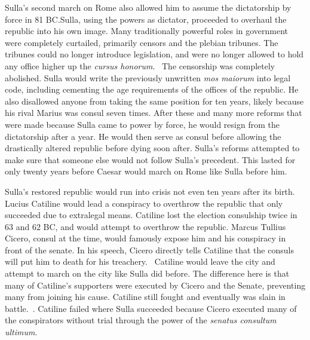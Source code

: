 \documentclass[12pt]{article}
\begin{document}
    Sulla's second march on Rome also allowed him to assume the dictatorship by force in 81 BC.\@ Sulla, using the powers as dictator, proceeded to overhaul the republic into his own image. Many traditionally powerful roles in government were completely curtailed, primarily censors and the plebian tribunes. The tribunes could no longer introduce legislation, and were no longer allowed to hold any office higher up the \emph{cursus honorum}.~\autocite[p. 124]{Flower-Sulla} The censorship was completely abolished. Sulla would write the previously unwritten \emph{mos maiorum} into legal code, including cementing the age requirements of the offices of the republic. He also disallowed anyone from taking the same position for ten years, likely because his rival Marius was consul seven times. After these and many more reforms that were made because Sulla came to power by force, he would resign from the dictatorship after a year. He would then serve as consul before allowing the drastically altered republic before dying soon after. Sulla's reforms attempted to make sure that someone else would not follow Sulla's precedent. This lasted for only twenty years before Caesar would march on Rome like Sulla before him.

    Sulla's restored republic would run into crisis not even ten years after its birth. Lucius Catiline would lead a conspiracy to overthrow the republic that only succeeded due to extralegal means. Catiline lost the election consulship twice in 63 and 62 BC, and would attempt to overthrow the republic. Marcus Tullius Cicero, consul at the time, would famously expose him and his conspiracy in front of the senate. In his speech, Cicero directly tells Catiline that the consuls will put him to death for his treachery.~\autocite{Cicero-Catiline} Catiline would leave the city and attempt to march on the city like Sulla did before. The difference here is that many of Catiline's supporters were executed by Cicero and the Senate, preventing many from joining his cause. Catiline still fought and eventually was slain in battle.~\cite{Sallust-Catiline}. Catiline failed where Sulla succeeded because Cicero executed many of the conspirators without trial through the power of the \emph{senatus consultum ultimum}.
\end{document}
